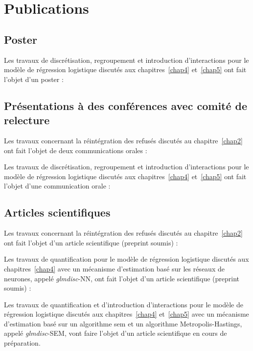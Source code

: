 \chapter{Publications}

\section{Poster}

Les travaux de discrétisation, regroupement et introduction d'interactions pour le modèle de régression logistique discutés aux chapitres~\ref{chap4} et~\ref{chap5} ont fait l'objet d'un poster :





\section{Présentations à des conférences avec comité de relecture}

Les travaux concernant la réintégration des refusés discutés au chapitre~\ref{chap2} ont fait l'objet de deux communications orales :



Les travaux de discrétisation, regroupement et introduction d'interactions pour le modèle de régression logistique discutés aux chapitres~\ref{chap4} et~\ref{chap5} ont fait l'objet d'une communication orale :


\section{Articles scientifiques}

Les travaux concernant la réintégration des refusés discutés au chapitre~\ref{chap2} ont fait l'objet d'un article scientifique (preprint soumis) :

\fullcite{}

Les travaux de quantification pour le modèle de régression logistique discutés aux chapitres~\ref{chap4} avec un mécanisme d'estimation basé sur les réseaux de neurones, appelé \textit{glmdisc}-NN, ont fait l'objet d'un article scientifique (preprint soumis) :

\fullcite{}

Les travaux de quantification et d'introduction d'interactions pour le modèle de régression logistique discutés aux chapitres~\ref{chap4} et~\ref{chap5} avec un mécanisme d'estimation basé sur un algorithme \gls{sem} et un algorithme Metropolis-Hastings, appelé \textit{glmdisc}-SEM, vont faire l'objet d'un article scientifique en cours de préparation.

